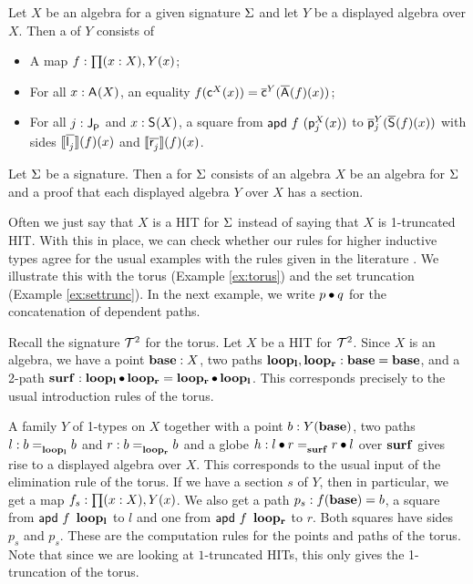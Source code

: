 \begin{definition}
\label{def:section}
Let $X$ be an algebra for a given signature $\Sigma$ and let $Y$ be a displayed algebra over $X$.
Then a  of $Y$ consists of
\begin{itemize}
	\item A map $f : \prod (x : X) , Y(x)$;
	\item For all $x : \mathsf{A}^{}(X)$, an equality $f(\mathsf{c}^{X}(x)) = \overline{\mathsf{c}}^{Y}(\overline{\mathsf{A}^{}}(f)(x))$;
	\item For all $j : \mathsf{J}^{}_{\mathsf{P}}$ and $x : \mathsf{S}^{}(X)$, a square from
	$\mathsf{apd} \ f \ (\mathsf{p}^{X}_{j}(x))$
	to
	$\overline{\mathsf{p}}^{Y}_{j}(\overline{\mathsf{S}^{}}(f)(x))$
	with sides
	$\llbracket \overline{\mathsf{l}^{}_j} \rrbracket(f)(x)$
	and
	$\llbracket \overline{\mathsf{r}^{}_j} \rrbracket(f)(x)$.
\end{itemize}
\end{definition}

\begin{definition}
Let $\Sigma$ be a signature.
Then a  for $\Sigma$ consists of an algebra $X$ be an algebra for $\Sigma$ and a proof that each displayed algebra $Y$ over $X$ has a section.
\end{definition}

Often we just say that $X$ is a HIT for $\Sigma$ instead of saying that $X$ is 1-truncated HIT.
With this in place, we can check whether our rules for higher inductive types
agree for the usual examples with the rules given in the literature \cite{hottbook}.
We illustrate this with the torus (Example \ref{ex:torus}) and the set truncation (Example \ref{ex:settrunc}).
In the next example, we write $p \bullet q$ for the concatenation of dependent paths.

\begin{example}
Recall the signature $\mathcal{T}^2$ for the torus.
Let $X$ be a HIT for $\mathcal{T}^2$.
Since $X$ is an algebra, we have a point $\operatorname{\mathbf{base}} : X$, two paths $\operatorname{\mathbf{loop_l}}, \operatorname{\mathbf{loop_r}} : \operatorname{\mathbf{base}} = \operatorname{\mathbf{base}}$,
and a 2-path $\operatorname{\mathbf{surf}} : \operatorname{\mathbf{loop_l}} \bullet \operatorname{\mathbf{loop_r}} = \operatorname{\mathbf{loop_r}} \bullet \operatorname{\mathbf{loop_l}}$.
This corresponds precisely to the usual introduction rules of the torus.

A family $Y$ of 1-types on $X$ together with a point $b : Y(\operatorname{\mathbf{base}})$,
two paths $l : b =_{\operatorname{\mathbf{loop_l}}}^{} b$ and $r : b =_{\operatorname{\mathbf{loop_r}}}^{} b$
and a globe $h : l \bullet r =_{\operatorname{\mathbf{surf}}}^{} r \bullet l$
over $\operatorname{\mathbf{surf}}$ gives rise to a displayed algebra over $X$.
This corresponds to the usual input of the elimination rule of the torus.
If we have a section $s$ of $Y$, then in particular, we get a map $f_s : \prod (x : X) , Y(x)$.
We also get a path $p_s : f(\operatorname{\mathbf{base}}) = b$, a square from $\mathsf{apd} \ f \ \operatorname{\mathbf{loop_l}}$ to $l$ and one from $\mathsf{apd} \ f \ \operatorname{\mathbf{loop_r}}$ to $r$.
Both squares have sides $p_s$ and $p_s$.
These are the computation rules for the points and paths of the torus.
Note that since we are looking at $1$-truncated HITs, this only gives the 1-truncation of the torus.
\end{example}

